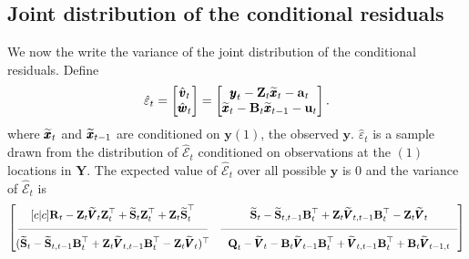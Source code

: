 \documentclass[]{article}
\def\UPS{\mbox{\boldmath $\Upsilon$}}
\def\XI{\mbox{\boldmath $\Xi$}}
\def\BB{\mbox{$\mathbf B$}}	\def\bb{\mbox{$\mathbf b$}} \def\Bb{\mbox{$\mathbf J$}} \def\Ba{\mbox{$\mathbf L$}} \def\Bm{\UPS}
\def\QQ{\mbox{$\mathbf Q$}}	 \def\qq{\mbox{$\mathbf q$}} \def\Qb{\mbox{$\mathbf G$}}  \def\Qm{\mathbb{Q}}
\def\RR{\mbox{$\mathbf R$}}	 \def\rr{\mbox{$\mathbf r$}} \def\Rb{\mbox{$\mathbf H$}}	\def\Rm{\mathbb{R}}
\def\Ss{\mbox{$\mathbf S$}}
\def\VV{\mbox{$\pmb{V}$}}	\def\vv{\mbox{$\pmb{v}$}}
\def\YY{\mbox{$\pmb{Y}$}}	\def\yy{\mbox{$\pmb{y}$}}
\def\ZZ{\mbox{$\mathbf Z$}}	\def\zz{\mbox{$\mathbf z$}}	\def\Zb{\mbox{$\mathbf M$}} \def\Za{\mbox{$\mathbf N$}} \def\Zm{\XI}
\def\hatxt{\widetilde{\xx}_t}
\def\hatxtm{\widetilde{\mbox{$\xx$}}_{t-1}}
\def\hatVt{\widetilde{\VV}_t}
\def\hatVtm{\widetilde{\VV}_{t-1}}
\def\hatVttm{\widetilde{\VV}_{t,t-1}}
\def\hatSt{\widetilde{\Ss}_t}
\def\hatSttm{\widetilde{\Ss}_{t,t-1}}
\begin{document}
\subsection{Joint distribution of the conditional residuals}
We now the write the variance of the joint distribution of the conditional residuals. Define
\begin{equation}
\hat{\varepsilon}_t = \begin{bmatrix}\hat{\vv}_t\\ \hat{\ww}_t\end{bmatrix} =
\begin{bmatrix}\yy_t - \ZZ_t\hatxt-\aa_t\\ \hatxt - \BB_t\hatxtm-\uu_t \end{bmatrix}.
\end{equation}
where $\hatxt$ and $\hatxtm$ are conditioned on $\yy{(1)}$, the observed $\yy$.
$\hat{\varepsilon}_t$ is a sample drawn from the distribution of $\hat{\mathcal{E}}_t$ conditioned on observations at the $(1)$ locations in $\YY$.  The expected value of $\hat{\mathcal{E}}_t$ over all possible $\yy$ is 0 and the variance of $\hat{\mathcal{E}}_t$  is
\begin{equation}\label{eqn:jointcondresid1general.t1}
 \begin{bmatrix}[c|c]
 \RR_t - \ZZ_t \hatVt \ZZ_t^\top + \hatSt\ZZ_t^\top+\ZZ_t\hatSt^\top&
 \hatSt - \hatSttm\BB_t^\top  + \ZZ_t\hatVttm\BB_t^\top - \ZZ_t\hatVt \\
 \rule[.5ex]{40ex}{0.25pt} & \rule[.5ex]{50ex}{0.25pt} \\
 (\hatSt - \hatSttm\BB_t^\top  + \ZZ_t\hatVttm\BB_t^\top - \ZZ_t\hatVt)^\top& 
 \QQ_t - \hatVt - \BB_t \hatVtm \BB_t^\top + \hatVttm \BB_t^\top + \BB_t\widetilde{\VV}_{t-1,t} \end{bmatrix}
\end{equation}
\end{document}
